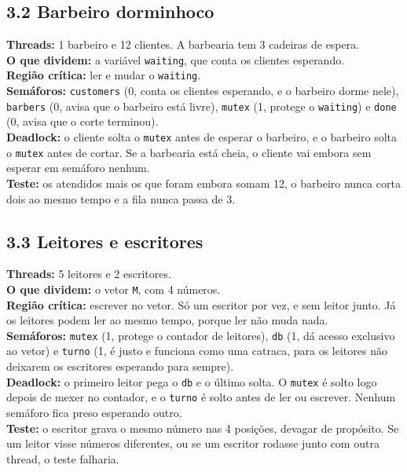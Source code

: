 \documentclass[12pt,a4paper]{article}
\begin{document}
\subsection*{3.2 Barbeiro dorminhoco}
\textbf{Threads:} 1 barbeiro e 12 clientes. A barbearia tem 3 cadeiras de espera.\\
\textbf{O que dividem:} a variável \texttt{waiting}, que conta os clientes esperando.\\
\textbf{Região crítica:} ler e mudar o \texttt{waiting}.\\
\textbf{Semáforos:} \texttt{customers} (0, conta os clientes esperando, e o barbeiro dorme nele), \texttt{barbers}
(0, avisa que o barbeiro está livre), \texttt{mutex} (1, protege o \texttt{waiting}) e \texttt{done} (0, avisa
que o corte terminou).\\
\textbf{Deadlock:} o cliente solta o \texttt{mutex} antes de esperar o barbeiro, e o barbeiro solta o \texttt{mutex}
antes de cortar. Se a barbearia está cheia, o cliente vai embora sem esperar em semáforo nenhum.\\
\textbf{Teste:} os atendidos mais os que foram embora somam 12, o barbeiro nunca corta dois ao mesmo tempo e a fila
nunca passa de 3.

\subsection*{3.3 Leitores e escritores}
\textbf{Threads:} 5 leitores e 2 escritores.\\
\textbf{O que dividem:} o vetor \texttt{M}, com 4 números.\\
\textbf{Região crítica:} escrever no vetor. Só um escritor por vez, e sem leitor junto. Já os leitores podem ler
ao mesmo tempo, porque ler não muda nada.\\
\textbf{Semáforos:} \texttt{mutex} (1, protege o contador de leitores), \texttt{db} (1, dá acesso exclusivo ao
vetor) e \texttt{turno} (1, é justo e funciona como uma catraca, para os leitores não deixarem os escritores
esperando para sempre).\\
\textbf{Deadlock:} o primeiro leitor pega o \texttt{db} e o último solta. O \texttt{mutex} é solto logo depois de
mexer no contador, e o \texttt{turno} é solto antes de ler ou escrever. Nenhum semáforo fica preso esperando outro.\\
\textbf{Teste:} o escritor grava o mesmo número nas 4 posições, devagar de propósito. Se um leitor visse números
diferentes, ou se um escritor rodasse junto com outra thread, o teste falharia.
\end{document}
